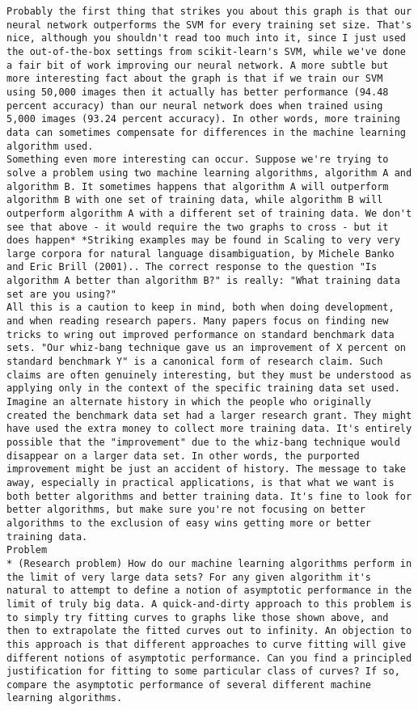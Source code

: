 \begin{lstlisting}
Probably the first thing that strikes you about this graph is that our neural network outperforms the SVM for every training set size. That's nice, although you shouldn't read too much into it, since I just used the out-of-the-box settings from scikit-learn's SVM, while we've done a fair bit of work improving our neural network. A more subtle but more interesting fact about the graph is that if we train our SVM using 50,000 images then it actually has better performance (94.48 percent accuracy) than our neural network does when trained using 5,000 images (93.24 percent accuracy). In other words, more training data can sometimes compensate for differences in the machine learning algorithm used.
Something even more interesting can occur. Suppose we're trying to solve a problem using two machine learning algorithms, algorithm A and algorithm B. It sometimes happens that algorithm A will outperform algorithm B with one set of training data, while algorithm B will outperform algorithm A with a different set of training data. We don't see that above - it would require the two graphs to cross - but it does happen* *Striking examples may be found in Scaling to very very large corpora for natural language disambiguation, by Michele Banko and Eric Brill (2001).. The correct response to the question "Is algorithm A better than algorithm B?" is really: "What training data set are you using?"
All this is a caution to keep in mind, both when doing development, and when reading research papers. Many papers focus on finding new tricks to wring out improved performance on standard benchmark data sets. "Our whiz-bang technique gave us an improvement of X percent on standard benchmark Y" is a canonical form of research claim. Such claims are often genuinely interesting, but they must be understood as applying only in the context of the specific training data set used. Imagine an alternate history in which the people who originally created the benchmark data set had a larger research grant. They might have used the extra money to collect more training data. It's entirely possible that the "improvement" due to the whiz-bang technique would disappear on a larger data set. In other words, the purported improvement might be just an accident of history. The message to take away, especially in practical applications, is that what we want is both better algorithms and better training data. It's fine to look for better algorithms, but make sure you're not focusing on better algorithms to the exclusion of easy wins getting more or better training data.
Problem
* (Research problem) How do our machine learning algorithms perform in the limit of very large data sets? For any given algorithm it's natural to attempt to define a notion of asymptotic performance in the limit of truly big data. A quick-and-dirty approach to this problem is to simply try fitting curves to graphs like those shown above, and then to extrapolate the fitted curves out to infinity. An objection to this approach is that different approaches to curve fitting will give different notions of asymptotic performance. Can you find a principled justification for fitting to some particular class of curves? If so, compare the asymptotic performance of several different machine learning algorithms. 

\end{lstlisting}
